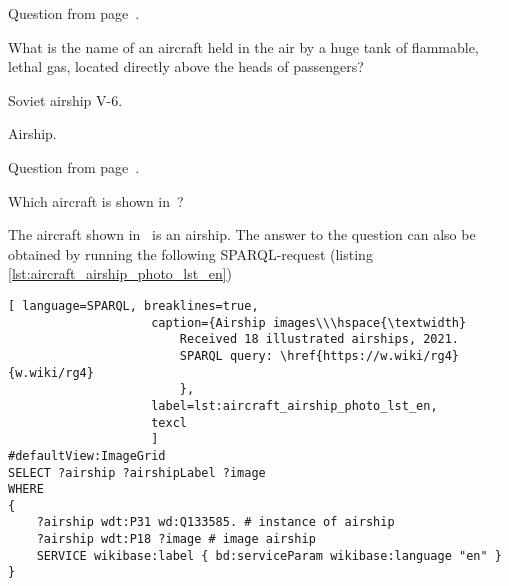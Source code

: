 Question from page~\pageref{question:aircraft_question_3}.


\begin{exercise}%
    \label{answer:aircraft_question_airship_en}
What is the name of an aircraft held in the air by a huge tank of flammable, lethal gas, located directly above the heads of passengers?
\end{exercise}

\begin{marginfigure}[0cm]
    {%
        \setlength{\fboxsep}{0pt}
        \setlength{\fboxrule}{1pt}
    }
	\caption{Soviet airship V-6.}
\end{marginfigure}

Airship. 

Question from page~\pageref{question:aircraft_question_4}.


\begin{exercise}%
\label{answer:aircraft_question_airship_2_en}
Which aircraft is shown in~?

\end{exercise}

The aircraft shown in~ is an airship. 
The answer to the question can also be obtained by running the following SPARQL-request (listing \ref{lst:aircraft_airship_photo_lst_en})

\begin{lstlisting}[ language=SPARQL, breaklines=true, 
                    caption={Airship images\\\hspace{\textwidth}
						Received 18 illustrated airships, 2021.
                        SPARQL query: \href{https://w.wiki/rg4}{w.wiki/rg4}
                        },
                    label=lst:aircraft_airship_photo_lst_en,
                    texcl 
                    ]
#defaultView:ImageGrid
SELECT ?airship ?airshipLabel ?image
WHERE
{
    ?airship wdt:P31 wd:Q133585. # instance of airship
  	?airship wdt:P18 ?image # image airship
    SERVICE wikibase:label { bd:serviceParam wikibase:language "en" }
}
\end{lstlisting}

